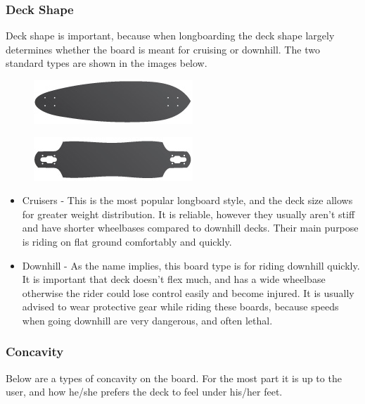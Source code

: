 \documentclass[titlepage, letterpaper,12pt]{article}
\begin{document}
\subsubsection{Deck Shape}
Deck shape is important, because when longboarding the deck shape largely determines whether the board is meant for cruising or downhill. The two standard types are shown in the images below.
\begin{figure}[!htbp]\centering
\begin{minipage}{.5\textwidth}\centering
\includegraphics[width=.8\textwidth]{cruiser.jpg}
\label{cruiser}
\end{minipage}%
\begin{minipage}{.5\textwidth}\centering
\includegraphics[width=.8\textwidth]{downhill.jpg}
\label{downhill}
\end{minipage}
\end{figure}
\begin{itemize}
\item Cruisers - This is the most popular longboard style, and the deck size allows for greater weight distribution. It is reliable, however they usually aren't stiff and have shorter wheelbases compared to downhill decks. Their main purpose is riding on flat ground comfortably and quickly.

\item Downhill - As the name implies, this board type is for riding downhill quickly. It is important that deck doesn't flex much, and has a wide wheelbase otherwise the rider could lose control easily and become injured. It is usually advised to wear protective gear while riding these boards, because speeds when going downhill are very dangerous, and often lethal.

\end{itemize}

\subsubsection{Concavity}
Below are a types of concavity on the board. For the most part it is up to the user, and how he/she prefers the deck to feel under his/her feet.
\end{document}
